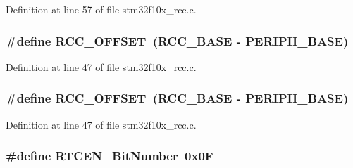 Definition at line 57 of file stm32f10x\+\_\+rcc.\+c.

\subsubsection[{\texorpdfstring{R\+C\+C\+\_\+\+O\+F\+F\+S\+ET}{RCC_OFFSET}}]{\setlength{\rightskip}{0pt plus 5cm}\#define R\+C\+C\+\_\+\+O\+F\+F\+S\+ET~({\bf R\+C\+C\+\_\+\+B\+A\+SE} -\/ {\bf P\+E\+R\+I\+P\+H\+\_\+\+B\+A\+SE})}\hypertarget{group___r_c_c___private___defines_ga539e07c3b3c55f1f1d47231341fb11e1}{}\label{group___r_c_c___private___defines_ga539e07c3b3c55f1f1d47231341fb11e1}


Definition at line 47 of file stm32f10x\+\_\+rcc.\+c.

\subsubsection[{\texorpdfstring{R\+C\+C\+\_\+\+O\+F\+F\+S\+ET}{RCC_OFFSET}}]{\setlength{\rightskip}{0pt plus 5cm}\#define R\+C\+C\+\_\+\+O\+F\+F\+S\+ET~({\bf R\+C\+C\+\_\+\+B\+A\+SE} -\/ {\bf P\+E\+R\+I\+P\+H\+\_\+\+B\+A\+SE})}\hypertarget{group___r_c_c___private___defines_ga539e07c3b3c55f1f1d47231341fb11e1}{}\label{group___r_c_c___private___defines_ga539e07c3b3c55f1f1d47231341fb11e1}


Definition at line 47 of file stm32f10x\+\_\+rcc.\+c.

\subsubsection[{\texorpdfstring{R\+T\+C\+E\+N\+\_\+\+Bit\+Number}{RTCEN_BitNumber}}]{\setlength{\rightskip}{0pt plus 5cm}\#define R\+T\+C\+E\+N\+\_\+\+Bit\+Number~0x0F}\hypertarget{group___r_c_c___private___defines_ga9302c551752124766afc4cee65436405}{}\label{group___r_c_c___private___defines_ga9302c551752124766afc4cee65436405}



